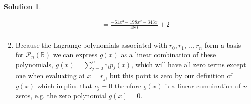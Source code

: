 \documentclass[10pt]{article}
\theoremstyle{definition}
\newtheorem{soln}{Solution}
\begin{document}
\begin{soln}
\begin{enumerate}[label=(\alph*)]
\begin{align*}
             & =\frac{-61x^3-198x^2+343x}{480}+2                                                                                                        \\
          \end{align*}
    \item Because the Lagrange polynomials associated with $r_0,r_1,\dots,r_n$ form a basis for $\mathcal{P}_n(\mathbb{R})$ we can express $g(x)$ as a
          linear combination of these polynomials, $g(x)=\sum_{j=0}^{n}c_jp_j(x)$, which will have all zero terms except one when evaluating at $x=r_j$, but this point is
          zero by our definition of $g(x)$ which implies that $c_j=0$ therefore $g(x)$ is a linear combination of $n$ zeros, e.g. the zero polynomial $g(x)=0$.
  \end{enumerate}
\end{soln}
\end{document}
